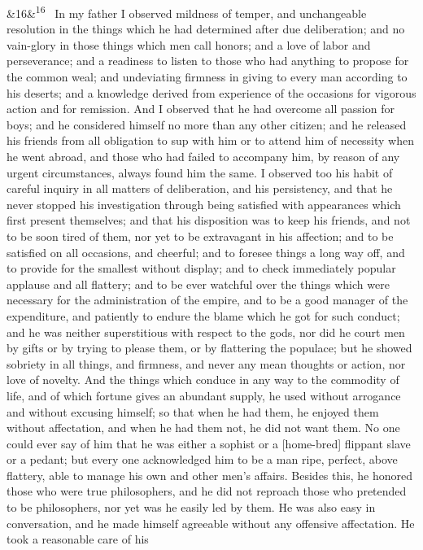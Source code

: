 \documentclass[12pt]{article}
\newcommand{\para}[1][]{\par\noindent\ifx&#1&\else\textsuperscript{\footnotesize #1}~\fi}
\begin{document}
\para[16] In my father I observed mildness of temper, and unchangeable
resolution in the things which he had determined after due deliberation;
and no vain-glory in those things which men call honors; and a love of
labor and perseverance; and a readiness to listen to those who had
anything to propose for the common weal; and undeviating firmness in
giving to every man according to his deserts; and a knowledge derived
from experience of the occasions for vigorous action and for remission.
And I observed that he had overcome all passion for boys; and he
considered himself no more than any other citizen; and he released
his friends from all obligation to sup with him or to attend him of
necessity when he went abroad, and those who had failed to accompany
him, by reason of any urgent circumstances, always found him the same. I
observed too his habit of careful inquiry in all matters of
deliberation, and his persistency, and that he never stopped his
investigation through being satisfied with appearances which first
present themselves; and that his disposition was to keep his friends,
and not to be soon tired of them, nor yet to be extravagant in his
affection; and to be satisfied on all occasions, and cheerful; and to
foresee things a long way off, and to provide for the smallest without
display; and to check immediately popular applause and all flattery; and
to be ever watchful over the things which were necessary for the
administration of the empire, and to be a good manager of the
expenditure, and patiently to endure the blame which he got for such
conduct; and he was neither superstitious with respect to the gods, nor
did he court men by gifts or by trying to please them, or by flattering
the populace; but he showed sobriety in all things, and firmness, and
never any mean thoughts or action, nor love of novelty. And the things
which conduce in any way to the commodity of life, and of which fortune
gives an abundant supply, he used without arrogance and without excusing
himself; so that when he had them, he enjoyed them without affectation,
and when he had them not, he did not want them. No one could ever say of
him that he was either a sophist or a [home-bred] flippant slave or a
pedant; but every one acknowledged him to be a man ripe, perfect, above
flattery, able to manage his own and other men's affairs. Besides this,
he honored those who were true philosophers, and he did not reproach
those who pretended to be philosophers, nor yet was he easily led by
them. He was also easy in conversation, and he made himself agreeable
without any offensive affectation. He took a reasonable care of his
\end{document}
